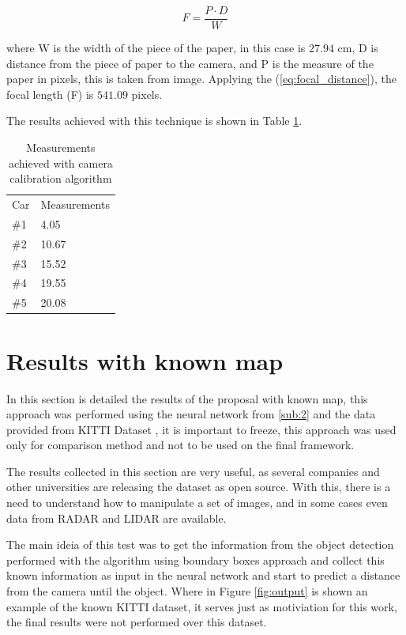 \begin{equation}
    \label{eq:focal_distance}
    F = \frac{P\cdot D}{W}
\end{equation}

where W is the width of the piece of the paper, in this case is $27.94$ cm, D is distance from the piece of paper to the camera, and P is the measure of the paper in pixels, this is taken from image. Applying the (\ref{eq:focal_distance}), the focal length (F) is $541.09$ pixels.





The results achieved with this technique is shown in Table \ref{tab:output_calibrate}. 

\begin{table}[H]
\centering
\caption{Measurements achieved with camera calibration algorithm}
\begin{tabular}{l|l} 
\toprule
Car &  Measurements      \\
\#1   & 4.05        \\
\#2   & 10.67       \\
\#3   & 15.52       \\
\#4   & 19.55       \\
\#5   & 20.08       \\
\bottomrule
\end{tabular}
\label{tab:output_calibrate}
\end{table} 



\section{Results with known map}
In this section is detailed the results of the proposal with known map, this approach was performed using the neural network from \ref{sub:2} and the data provided from KITTI Dataset \cite{geiger2013vision}, it is important to freeze, this approach was used only for comparison method and not to be used on the final framework. 


The results collected in this section are very useful, as several companies and other universities are releasing the dataset as open source. With this, there is a need to understand how to manipulate a set of images, and in some cases even data from RADAR and LIDAR are available.

The main ideia of this test was to get the information from the object detection performed with the algorithm using boundary boxes approach and collect this known information as input in the neural network and start to predict a distance from the camera until the object. Where in Figure \ref{fig:output} is shown an example of the known KITTI dataset, it serves just as motiviation for this work, the final results were not performed over this dataset. 

